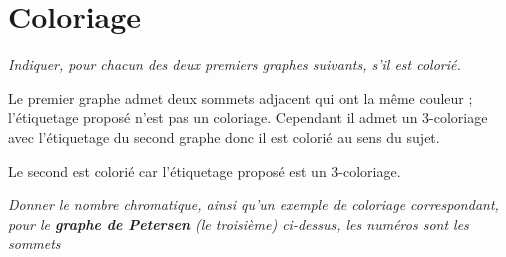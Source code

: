 \section{Coloriage} 
\begin{Exercise}\it
Indiquer, pour chacun des deux premiers graphes suivants, s'il est colorié.
\end{Exercise}
\begin{Answer}
Le premier graphe admet deux sommets adjacent qui ont la même couleur ; l'étiquetage proposé n'est pas un coloriage. Cependant il admet un 3-coloriage avec l'étiquetage du second graphe donc il est colorié au sens du sujet.

Le second est colorié car l'étiquetage proposé est un 3-coloriage.
\end{Answer}
\begin{center}
\end{center}
\begin{Exercise} \it 
Donner le nombre chromatique, ainsi qu'un exemple de coloriage correspondant, pour le {\bf graphe de Petersen} (le troisième) ci-dessus, les numéros sont les sommets
\end{Exercise} 
